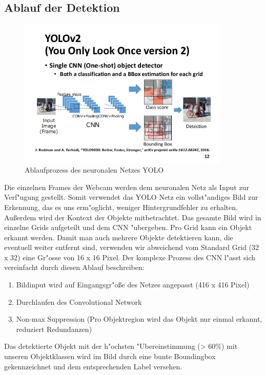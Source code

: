 \subsection{Ablauf der Detektion}

\begin{figure}[h]
	\centering
	\includegraphics[width=0.9\textwidth,trim={1.2cm 1cm 1cm 6.3cm},clip]{images/yolo_schaubild}
	\caption{Ablaufprozess des neuronalen Netzes YOLO}
	\label{fig:yolo}
\end{figure}

Die einzelnen Frames der Webcam werden dem neuronalen Netz als Input zur Verf"ugung gestellt. Somit verwendet das YOLO Netz ein vollst"andiges Bild zur Erkennung, das es uns erm"oglicht, weniger Hintergrundfehler zu erhalten. Au\ss erdem wird der Kontext der Objekte mitbetrachtet. Das gesamte Bild wird in einzelne Grids aufgeteilt und dem CNN "ubergeben. Pro Grid kann ein Objekt erkannt werden. Damit man auch mehrere Objekte detektieren kann, die eventuell weiter entfernt sind, verwenden wir abweichend vom Standard Grid (32 x 32) eine Gr"osse von 16 x 16 Pixel. Der komplexe Prozess des CNN l"asst sich vereinfacht durch diesen Ablauf beschreiben:

\begin{enumerate}
	\item Bildinput wird auf Eingangsgr"o\ss e des Netzes angepasst (416 x 416 Pixel)
	\item Durchlaufen des Convolutional Network
	\item Non-max Suppression (Pro Objektregion wird das Objekt nur einmal erkannt, reduziert Redundanzen) 
\end{enumerate}

Das detektierte Objekt mit der h"ochsten "Ubereinstimmung (> 60\%) mit unseren Objektklassen wird im Bild durch eine bunte Boundingbox gekennzeichnet und dem entsprechenden Label versehen.

